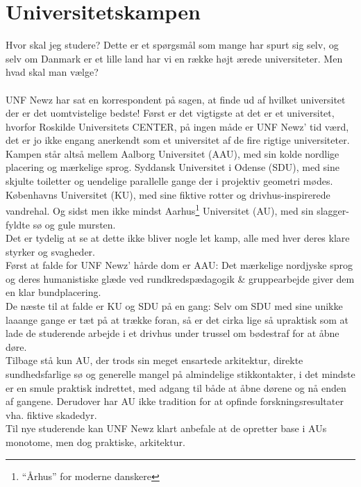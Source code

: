 

\begin{minipage}[b]{0.95\linewidth}
\begin{minipage}[t]{0.47\textwidth}
\vspace{3mm}
\section*{Universitetskampen}
Hvor skal jeg studere? Dette er et spørgsmål som mange har spurt sig selv, og selv om Danmark er et lille land har vi en række højt ærede universiteter. Men hvad skal man vælge?\\ \\
UNF Newz har sat en korrespondent på sagen, at finde ud af hvilket universitet der er det uomtvistelige bedste!
Først er det vigtigste at det er et universitet, hvorfor Roskilde Universitets CENTER, på ingen måde er UNF Newz' tid værd, det er jo ikke engang anerkendt som et universitet af de fire rigtige universiteter.\\
Kampen står altså mellem Aalborg Universitet (AAU), med sin kolde nordlige placering og mærkelige sprog. Syddansk Universitet i Odense (SDU), med sine skjulte toiletter og uendelige parallelle gange der i projektiv geometri mødes. Københavns Universitet (KU), med sine fiktive rotter og drivhus-inspirerede vandrehal. Og sidst men ikke mindst Aarhus\footnote{``Århus'' for moderne danskere} Universitet (AU), med sin slagger-fyldte sø og gule mursten.\\
Det er tydelig at se at dette ikke bliver nogle let kamp, alle med hver deres klare styrker og svagheder. \\
Først at falde for UNF Newz' hårde dom er AAU: Det mærkelige nordjyske sprog og deres humanistiske glæde ved rundkredspædagogik \& gruppearbejde giver dem en klar bundplacering.\\ 
De næste til at falde er KU og SDU på en gang: Selv om SDU med sine unikke laaange gange er tæt på at trække foran, så er det cirka lige så upraktisk som at lade de studerende arbejde i et drivhus under trussel om bødestraf for at åbne døre. \\
Tilbage stå kun AU, der trods sin meget ensartede arkitektur, direkte sundhedsfarlige sø og generelle mangel på almindelige stikkontakter, i det mindste er en smule praktisk indrettet, med adgang til både at åbne dørene og nå enden af gangene. Derudover har AU ikke tradition for at opfinde forskningsresultater vha. fiktive skadedyr. \\
Til nye studerende kan UNF Newz klart anbefale at de opretter base i AUs monotome, men dog praktiske, arkitektur. 
\vspace{3mm}


\end{minipage}
\end{minipage}
